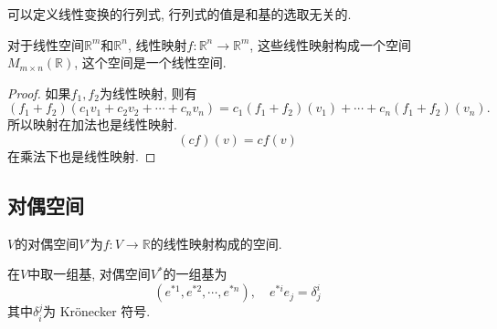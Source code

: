 
可以定义线性变换的行列式, 行列式的值是和基的选取无关的.

对于线性空间$\mathbb{R}^{m}$和$\mathbb{R}^{n}$, 线性映射$f\colon \mathbb{R}^{n} \to  \mathbb{R}^{m}$, 这些线性映射构成一个空间$M_{m \times n}\left( \mathbb{R} \right) $, 这个空间是一个线性空间.
\begin{proof}
    如果$f_1, f_2$为线性映射, 则有
    \begin{equation}
      \left( f_1 + f_2 \right) \left( c_1v_1 + c_2v_2+ \cdots + c_n v_n \right) = c_1 \left( f_1 + f_2 \right) \left( v_1 \right) + \cdots + c_n \left( f_1 + f_2 \right) \left( v_n \right) .
    \end{equation}
    所以映射在加法也是线性映射.
    \begin{equation}
      \left( cf \right) \left( v \right) = c f\left( v \right) 
    \end{equation}
    在乘法下也是线性映射.
\end{proof}

\subsection{对偶空间}
\begin{definition}
    $V$的对偶空间$V'$为$f\colon V\to \mathbb{R}$的线性映射构成的空间.
\end{definition}
在$V$中取一组基, 对偶空间$V^{*}$的一组基为
\begin{equation}
  \left( e^{*1},e^{*2},\cdots,e^{*n} \right) , \quad e^{*i} e_j = \delta_{j}^{i}
\end{equation}
其中$\delta^{j}_{i}$为 Kr\"onecker 符号.
